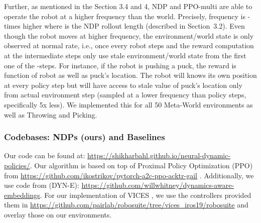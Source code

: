 \documentclass{article}
\newcommand{\our}{NDP\xspace}
\begin{document}
Further, as mentioned in the Section 3.4 and 4, \our and PPO-multi are able to operate the robot at a higher frequency than the world. Precisely, frequency is -times higher where  is the \our rollout length (described in Section~3.2). Even though the robot moves at higher frequency, the environment/world state is only observed at normal rate, i.e., once every  robot steps and the reward computation at the intermediate  steps only use stale environment/world state from the first one of the -steps. For instance, if the robot is pushing a puck, the reward is function of robot as well as puck's location. The robot will knows its own position at every policy step but will have access to stale value of puck's location only from actual environment step (sampled at a lower frequency than policy steps, specifically 5x less).  We implemented this for all 50 Meta-World environments as well as Throwing and Picking.

\subsubsection*{Codebases: NDPs (ours) and Baselines}
Our code can be found at: \url{https://shikharbahl.github.io/neural-dynamic-policies/}. Our algorithm is based on top of Proximal Policy Optimization (PPO) \cite{ppo} from \url{https://github.com/ikostrikov/pytorch-a2c-ppo-acktr-gail} \cite{pytorchrl}.
Additionally, we use code from \citet{whitney2019dynamics} (DYN-E): \url{https://github.com/willwhitney/dynamics-aware-embeddings}. For our implementation of VICES \cite{vices2019martin}, we use the controllers provided them in \url{https://github.com/pairlab/robosuite/tree/vices_iros19/robosuite} and overlay those on our environments.
 
\end{document}
